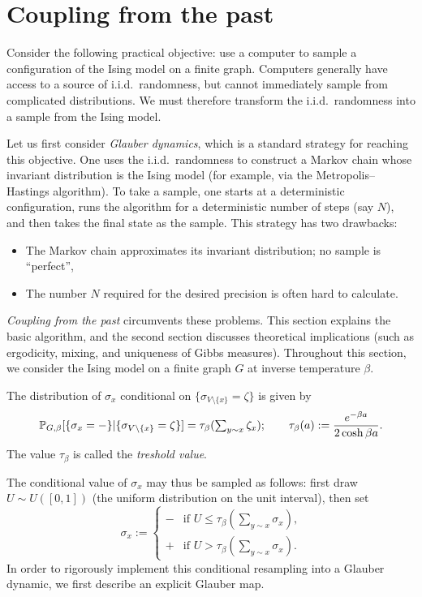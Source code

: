 \newpage 

\section{Coupling from the past}

Consider the following practical objective:
use a computer to sample a configuration of the Ising model on a finite graph.
Computers generally have access to a source of i.i.d.\ randomness,
but cannot immediately sample from complicated distributions.
We must therefore transform the i.i.d.\ randomness
into a sample from the Ising model.

Let us first consider \emph{Glauber dynamics},
which is a standard strategy for reaching this objective.
One uses the i.i.d.\ randomness
to construct a Markov chain whose invariant distribution is the Ising model
(for example, via the Metropolis--Hastings algorithm).
To take a sample, one starts at a deterministic configuration, runs the algorithm for a deterministic number of steps (say $N$),
and then takes the final state as the sample.
This strategy has two drawbacks:
\begin{itemize}
    \item The Markov chain approximates its invariant distribution;
    no sample is ``perfect'',
    \item The number $N$ required for the desired precision is often hard to calculate.
\end{itemize}

\emph{Coupling from the past} circumvents these problems.
This section explains the basic algorithm,
and the second section discusses theoretical implications (such as ergodicity, mixing, and uniqueness of Gibbs measures).
Throughout this section, we consider the Ising model
on a finite graph $G$ at inverse temperature $\beta$.

\begin{definition}
    The distribution of $\sigma_x$ conditional on $\{\sigma_{V\setminus\{x\}}=\zeta\}$ is given by
    \[
        \P_{G,\beta}[\{\sigma_x=-\}|\{\sigma_{V\setminus\{x\}}=\zeta\}]
        =
        \tau_\beta({\textstyle\sum_{y\sim x}\zeta_x});
        \qquad
        \tau_\beta(a):=\frac{e^{-\beta a}}{2\cosh\beta a}.
    \]
    The value $\tau_\beta$ is called the \emph{treshold value}.
\end{definition}

The conditional value of $\sigma_x$ may thus be sampled as follows:
first draw $U\sim U([0,1])$ (the uniform distribution on the unit interval),
then set
\[
    \sigma_x:=\begin{cases}
        - &\text{if $U\leq \tau_\beta(\sum_{y\sim x}\sigma_x)$,}\\
        + &\text{if $U> \tau_\beta(\sum_{y\sim x}\sigma_x)$.}
    \end{cases}
\]
In order to rigorously implement this conditional resampling into a Glauber dynamic,
we first describe an explicit Glauber map.


